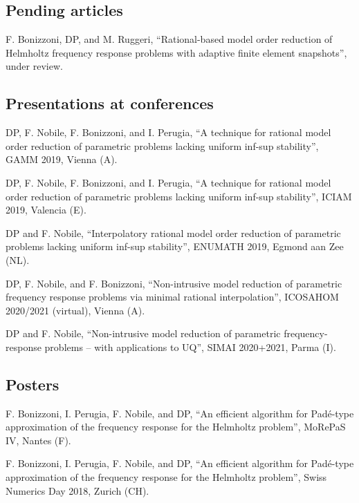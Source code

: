 \documentclass[11pt]{article} %
\begin{document}
\subsection*{Pending articles}

\hspace{\parindent}F. Bonizzoni, DP, and M. Ruggeri, ``Rational-based model order reduction of Helmholtz frequency response problems with adaptive finite element snapshots'', under review.

\subsection*{Presentations at conferences}

\hspace{\parindent}DP, F. Nobile, F. Bonizzoni, and I. Perugia, ``A technique for rational model order reduction of parametric problems lacking uniform inf-sup stability'', GAMM 2019, Vienna (A).

DP, F. Nobile, F. Bonizzoni, and I. Perugia, ``A technique for rational model order reduction of parametric problems lacking uniform inf-sup stability'', ICIAM 2019, Valencia (E).

\yearsminus DP and F. Nobile, ``Interpolatory rational model order reduction of parametric problems lacking uniform inf-sup stability'', \mbox{ENUMATH} 2019, Egmond aan Zee (NL).

DP, F. Nobile, and F. Bonizzoni, ``Non-intrusive model reduction of parametric frequency response problems via minimal rational interpolation'', \mbox{ICOSAHOM} 2020/2021 (virtual), Vienna (A).

\yearsminus DP and F. Nobile, ``Non-intrusive model reduction of parametric frequency-response problems -- with applications to UQ'', SIMAI 2020+2021, Parma (I).

\subsection*{Posters}

\hspace{\parindent}F. Bonizzoni, I. Perugia, F. Nobile, and DP, ``An efficient algorithm for Pad\'e-type approximation of the frequency response for the Helmholtz problem'', \mbox{MoRePaS} IV, Nantes (F).

\yearsminus F. Bonizzoni, I. Perugia, F. Nobile, and DP, ``An efficient algorithm for Pad\'e-type approximation of the frequency response for the Helmholtz problem'', Swiss Numerics Day 2018, Zurich (CH).
\end{document}
